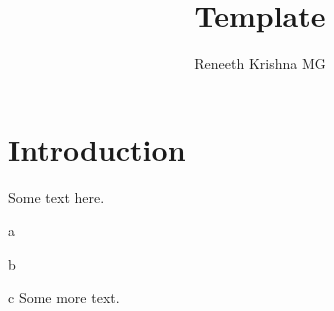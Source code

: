 \documentclass[12pt]{article}
\begin{document}
\rhead{\today}

\title{Template}
\author{Reneeth Krishna MG}
\maketitle

\setcounter{tocdepth}{1}
\tableofcontents

\section{Introduction}
Some text here.
\ulb
\item a
\item b
\item c
\ule
Some more text.
\end{document}
